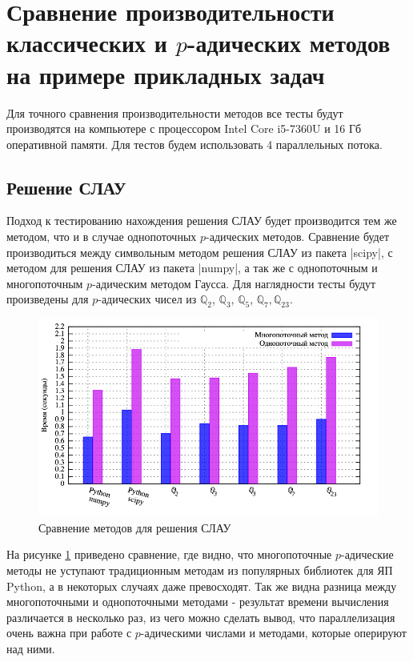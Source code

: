 \documentclass[master, och, diploma, times]{sty/SCWorks}
\theoremstyle{plain}
\theoremstyle{definition}
\numberwithin{equation}{section}
\begin{document}
\section{Сравнение производительности классических и $p$-адических методов на примере прикладных задач}

Для точного сравнения производительности методов все тесты будут производятся на компьютере с процессором Intel Core i5-7360U и 16 Гб оперативной памяти. Для тестов будем использовать 4 параллельных потока.

\subsection{Решение СЛАУ}
Подход к тестированию нахождения решения СЛАУ будет производится тем же методом, что и в случае однопоточных $p$-адических методов. Сравнение будет производиться между символьным методом решения СЛАУ из пакета |scipy|, с методом для решения СЛАУ из пакета |numpy|, а так же с однопоточным и многопоточным $p$-адическим методом Гаусса. Для наглядности тесты будут произведены для $p$-адических чисел из $\mathbb{Q}_2$, $\mathbb{Q}_3$, $\mathbb{Q}_5$, $\mathbb{Q}_7, \mathbb{Q}_23$. 


\begin{figure}[H]
\centerline{\includegraphics[width=0.85\linewidth]{../gnuplot/multi/gauss/plot.png}}
\caption{Сравнение методов для решения СЛАУ}
\label{img:multi:gauss}
\end{figure}

На рисунке \ref{img:multi:gauss} приведено сравнение, где видно, что многопоточные $p$-адические методы не уступают традиционным методам из популярных библиотек для ЯП Python, а в некоторых случаях даже превосходят. Так же видна разница между многопоточными и однопоточными методами - результат времени вычисления различается в несколько раз, из чего можно сделать вывод, что параллелизация очень важна при работе с $p$-адическими числами и методами, которые оперируют над ними.
\end{document}
